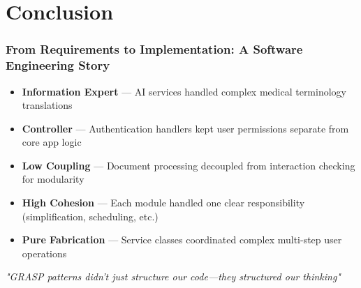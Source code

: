 \documentclass{beamer}
\begin{document}
\section{Conclusion}
\begin{frame}
  \frametitle{From Requirements to Implementation: A Software Engineering Story}
  
  
  \vspace{-0.3cm}
  
  \begin{bluebox}
    \begin{itemize}
      \item[\textcolor{rxblue}{\faRobot}] \textbf{Information Expert} — AI services handled complex medical terminology translations
      \item[\textcolor{rxblue}{\faUserShield}] \textbf{Controller} — Authentication handlers kept user permissions separate from core app logic
      \item[\textcolor{rxblue}{\faLaptopCode}] \textbf{Low Coupling} — Document processing decoupled from interaction checking for modularity
      \item[\textcolor{rxblue}{\faChartBar}] \textbf{High Cohesion} — Each module handled one clear responsibility (simplification, scheduling, etc.)
      \item[\textcolor{rxblue}{\faUsers}] \textbf{Pure Fabrication} — Service classes coordinated complex multi-step user operations
    \end{itemize}
  \end{bluebox}
  
  \vspace{0.3cm}
  
  \begin{center}
    \begin{greenbox}
      \centering
      \textit{"GRASP patterns didn't just structure our code—they structured our thinking"}
    \end{greenbox}
  \end{center}
\end{frame}
\end{document}

